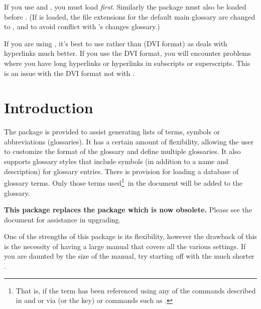\documentclass[report,inlinetitle,widecs]{nlctdoc}
\newcommand*{\gloskey}[2][newglossaryentry]{\csopt{#1}{#2}}
\begin{document}
\begin{important}
If you use  and , you must load
 \emph{first}. Similarly the  package must
also be loaded before . (If  is loaded,
the file extensions for the default main glossary are changed to
,  and  to avoid
conflict with 's changes
glossary.)\hypertarget{pdflatexnote}{}%

If you are using , it's best to use 
rather than  (DVI format) as  deals with
hyperlinks much better. If you use the DVI format, you will
encounter problems where you have long hyperlinks or hyperlinks in
subscripts or superscripts. This is an issue with the DVI format not
with .
\end{important}

\clearpage
{}
\tableofcontents
\clearpage
{}
\listofexamples
\clearpage
{}
\listoftables

\clearpage
\printglossaries

\glsresetall

 \chapter{Introduction}
\label{sec:intro}

The  package is provided to assist generating
lists of terms, symbols or abbreviations (glossaries). It has a certain amount of flexibility, allowing the
user to customize the format of the glossary and define multiple
glossaries. It also supports glossary styles that
include symbols (in addition to a name and description) for glossary
entries. There is provision for loading a database of glossary
terms. Only those terms used\footnote{That is, if the term has been
referenced using any of the commands described in
 and  or via
 (or the \gloskey{see} key) or commands such as
.}\ in the document will be added to the glossary.

\textbf{This package replaces the  package which is
now obsolete.} Please see the document  for
assistance in upgrading.

One of the strengths of this package is its flexibility, however
the drawback of this is the necessity of having a large manual
that covers all the various settings. If you are daunted by the
size of the manual, try starting off with the much shorter
.
\end{document}
